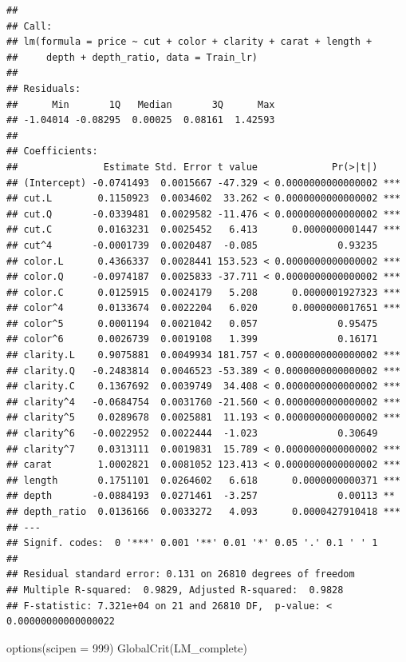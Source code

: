 \documentclass[
]{article}
\newenvironment{Shaded}{\begin{snugshade}}{\end{snugshade}}
\newcommand{\AttributeTok}[1]{\textcolor[rgb]{0.77,0.63,0.00}{#1}}
\newcommand{\DecValTok}[1]{\textcolor[rgb]{0.00,0.00,0.81}{#1}}
\newcommand{\FunctionTok}[1]{\textcolor[rgb]{0.00,0.00,0.00}{#1}}
\newcommand{\NormalTok}[1]{#1}
\begin{document}
\begin{verbatim}
##
## Call:
## lm(formula = price ~ cut + color + clarity + carat + length +
##     depth + depth_ratio, data = Train_lr)
##
## Residuals:
##      Min       1Q   Median       3Q      Max
## -1.04014 -0.08295  0.00025  0.08161  1.42593
##
## Coefficients:
##               Estimate Std. Error t value             Pr(>|t|)
## (Intercept) -0.0741493  0.0015667 -47.329 < 0.0000000000000002 ***
## cut.L        0.1150923  0.0034602  33.262 < 0.0000000000000002 ***
## cut.Q       -0.0339481  0.0029582 -11.476 < 0.0000000000000002 ***
## cut.C        0.0163231  0.0025452   6.413      0.0000000001447 ***
## cut^4       -0.0001739  0.0020487  -0.085              0.93235
## color.L      0.4366337  0.0028441 153.523 < 0.0000000000000002 ***
## color.Q     -0.0974187  0.0025833 -37.711 < 0.0000000000000002 ***
## color.C      0.0125915  0.0024179   5.208      0.0000001927323 ***
## color^4      0.0133674  0.0022204   6.020      0.0000000017651 ***
## color^5      0.0001194  0.0021042   0.057              0.95475
## color^6      0.0026739  0.0019108   1.399              0.16171
## clarity.L    0.9075881  0.0049934 181.757 < 0.0000000000000002 ***
## clarity.Q   -0.2483814  0.0046523 -53.389 < 0.0000000000000002 ***
## clarity.C    0.1367692  0.0039749  34.408 < 0.0000000000000002 ***
## clarity^4   -0.0684754  0.0031760 -21.560 < 0.0000000000000002 ***
## clarity^5    0.0289678  0.0025881  11.193 < 0.0000000000000002 ***
## clarity^6   -0.0022952  0.0022444  -1.023              0.30649
## clarity^7    0.0313111  0.0019831  15.789 < 0.0000000000000002 ***
## carat        1.0002821  0.0081052 123.413 < 0.0000000000000002 ***
## length       0.1751101  0.0264602   6.618      0.0000000000371 ***
## depth       -0.0884193  0.0271461  -3.257              0.00113 **
## depth_ratio  0.0136166  0.0033272   4.093      0.0000427910418 ***
## ---
## Signif. codes:  0 '***' 0.001 '**' 0.01 '*' 0.05 '.' 0.1 ' ' 1
##
## Residual standard error: 0.131 on 26810 degrees of freedom
## Multiple R-squared:  0.9829, Adjusted R-squared:  0.9828
## F-statistic: 7.321e+04 on 21 and 26810 DF,  p-value: < 0.00000000000000022
\end{verbatim}

\begin{Shaded}
\begin{Highlighting}[]
\FunctionTok{options}\NormalTok{(}\AttributeTok{scipen =} \DecValTok{999}\NormalTok{)}
\FunctionTok{GlobalCrit}\NormalTok{(LM\_complete)}
\end{Highlighting}
\end{Shaded}
\end{document}
